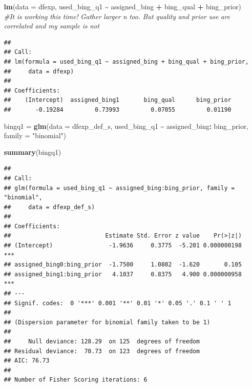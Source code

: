 \documentclass[
  11pt,
]{article}
\newenvironment{Shaded}{\begin{snugshade}}{\end{snugshade}}
\newcommand{\AttributeTok}[1]{\textcolor[rgb]{0.13,0.29,0.53}{#1}}
\newcommand{\CommentTok}[1]{\textcolor[rgb]{0.56,0.35,0.01}{\textit{#1}}}
\newcommand{\FunctionTok}[1]{\textcolor[rgb]{0.13,0.29,0.53}{\textbf{#1}}}
\newcommand{\NormalTok}[1]{#1}
\newcommand{\OtherTok}[1]{\textcolor[rgb]{0.56,0.35,0.01}{#1}}
\newcommand{\SpecialCharTok}[1]{\textcolor[rgb]{0.81,0.36,0.00}{\textbf{#1}}}
\newcommand{\StringTok}[1]{\textcolor[rgb]{0.31,0.60,0.02}{#1}}
\begin{document}
\begin{Shaded}
\begin{Highlighting}[]
\FunctionTok{lm}\NormalTok{(}\AttributeTok{data =}\NormalTok{ dfexp, used\_bing\_q1 }\SpecialCharTok{\textasciitilde{}}\NormalTok{ assigned\_bing }\SpecialCharTok{+}\NormalTok{ bing\_qual }\SpecialCharTok{+}\NormalTok{ bing\_prior) }\CommentTok{\#It is working this time! Gather larger n too. But quality and prior use are correlated and my sample is not }
\end{Highlighting}
\end{Shaded}

\begin{verbatim}
## 
## Call:
## lm(formula = used_bing_q1 ~ assigned_bing + bing_qual + bing_prior, 
##     data = dfexp)
## 
## Coefficients:
##    (Intercept)  assigned_bing1       bing_qual      bing_prior  
##       -0.19284         0.73993         0.07055         0.01190
\end{verbatim}

\begin{Shaded}
\begin{Highlighting}[]
\NormalTok{bingq1 }\OtherTok{=} \FunctionTok{glm}\NormalTok{(}\AttributeTok{data =}\NormalTok{ dfexp\_def\_s, used\_bing\_q1 }\SpecialCharTok{\textasciitilde{}}\NormalTok{ assigned\_bing}\SpecialCharTok{:}\NormalTok{ bing\_prior, }\AttributeTok{family =} \StringTok{"binomial"}\NormalTok{)}

\FunctionTok{summary}\NormalTok{(bingq1)}
\end{Highlighting}
\end{Shaded}

\begin{verbatim}
## 
## Call:
## glm(formula = used_bing_q1 ~ assigned_bing:bing_prior, family = "binomial", 
##     data = dfexp_def_s)
## 
## Coefficients:
##                           Estimate Std. Error z value    Pr(>|z|)    
## (Intercept)                -1.9636     0.3775  -5.201 0.000000198 ***
## assigned_bing0:bing_prior  -1.7500     1.0802  -1.620       0.105    
## assigned_bing1:bing_prior   4.1037     0.8375   4.900 0.000000958 ***
## ---
## Signif. codes:  0 '***' 0.001 '**' 0.01 '*' 0.05 '.' 0.1 ' ' 1
## 
## (Dispersion parameter for binomial family taken to be 1)
## 
##     Null deviance: 128.29  on 125  degrees of freedom
## Residual deviance:  70.73  on 123  degrees of freedom
## AIC: 76.73
## 
## Number of Fisher Scoring iterations: 6
\end{verbatim}

\begin{Shaded}
\end{Shaded}
\end{document}
